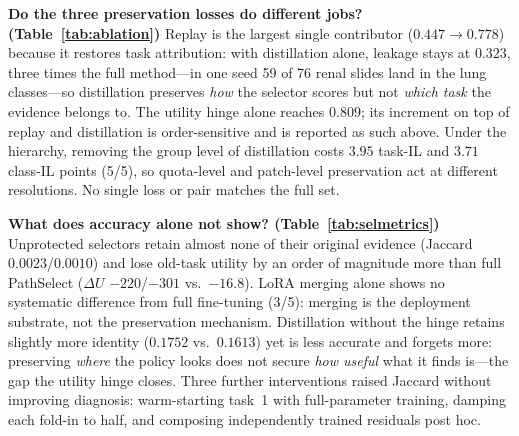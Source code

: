 \documentclass{article}
\begin{document}
\textbf{Do the three preservation losses do different jobs? (Table~\ref{tab:ablation})}
Replay is the largest single contributor ($0.447\rightarrow0.778$) because it restores task attribution: with distillation alone, leakage stays at $0.323$, three times the full method---in one seed 59 of 76 renal slides land in the lung classes---so distillation preserves \emph{how} the selector scores but not \emph{which task} the evidence belongs to. The utility hinge alone reaches $0.809$; its increment on top of replay and distillation is order-sensitive and is reported as such above. Under the hierarchy, removing the group level of distillation costs $3.95$ task-IL and $3.71$ class-IL points (5/5), so quota-level and patch-level preservation act at different resolutions. No single loss or pair matches the full set.

\begin{table}[t]
\centering\footnotesize
\caption{\textbf{Selection-level metrics under the ablation protocol} (flat, fold 1, mean over 5 seeds): what accuracy alone cannot show.}
\label{tab:selmetrics}
\end{table}

\textbf{What does accuracy alone not show? (Table~\ref{tab:selmetrics})}
Unprotected selectors retain almost none of their original evidence (Jaccard $0.0023$/$0.0010$) and lose old-task utility by an order of magnitude more than full PathSelect ($\Delta U$ $-220$/$-301$ vs.\ $-16.8$). LoRA merging alone shows no systematic difference from full fine-tuning (3/5): merging is the deployment substrate, not the preservation mechanism. Distillation without the hinge retains slightly more identity ($0.1752$ vs.\ $0.1613$) yet is less accurate and forgets more: preserving \emph{where} the policy looks does not secure \emph{how useful} what it finds is---the gap the utility hinge closes. Three further interventions raised Jaccard without improving diagnosis: warm-starting task~1 with full-parameter training, damping each fold-in to half, and composing independently trained residuals post hoc.
\end{document}
